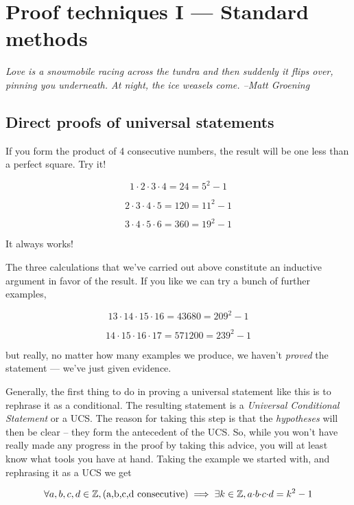 

\chapter[Proof techniques I]{Proof techniques I --- Standard methods}
\label{ch:proof1}

{\em Love is a snowmobile racing across the tundra and then suddenly it %
 flips over, pinning you underneath. At night, the  %
 ice weasels come. --Matt Groening} 

\section{Direct proofs of universal statements}
\label{sec:direct}

If you form the product of 4 consecutive numbers, the result will be one 
less than a perfect square.  Try it!

\[ 1 \cdot 2 \cdot 3 \cdot 4 = 24 = 5^2 - 1 \]

\[ 2 \cdot 3 \cdot 4 \cdot 5 = 120 = 11^2 - 1 \]

\[ 3 \cdot 4 \cdot 5 \cdot 6 = 360 = 19^2 - 1 \]

It always works!

The three calculations that we've carried out above constitute an
inductive argument in favor of the result.  If you like we can try 
a bunch of further examples,

\[ 13 \cdot 14 \cdot 15 \cdot 16 = 43680 = 209^2 - 1 \]

\[ 14 \cdot 15 \cdot 16 \cdot 17 = 571200 = 239^2 - 1 \]

\noindent but really, no matter how many examples we produce, we haven't 
{\em proved} the statement --- we've just given evidence.


Generally, the first thing to do in proving a universal statement like 
this is to rephrase it as a conditional.  The resulting statement is a 
\emph{Universal Conditional Statement} 
or a UCS.  The reason for taking 
this step is that the \emph{hypotheses} will then be clear -- they form 
the antecedent of the UCS.  So, while you won't have really made any 
progress in the proof by taking this advice, you will at least know what tools
you have at hand.  Taking the example we started with, and rephrasing 
it as a UCS we get

\[ \forall a,b,c,d \in {\mathbb Z}, (\mbox{a,b,c,d  consecutive}) 
\implies \exists k \in {\mathbb Z}, a{\cdot}b{\cdot}c{\cdot}d = k^2 -1 
\]

